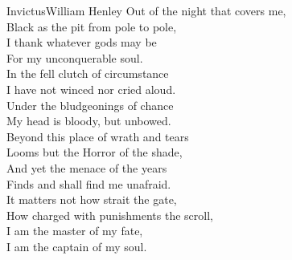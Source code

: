 \documentclass[../main.tex]{subfiles}
\begin{document}
	
	\begin{poem*}{Invictus}{William Henley}
		Out of the night that covers me,\\
		\hspace{2em}Black as the pit from pole to pole,\\
		I thank whatever gods may be\\
		\hspace{2em}For my unconquerable soul.\\[12pt]

		In the fell clutch of circumstance\\
		\hspace{2em}I have not winced nor cried aloud.\\
		Under the bludgeonings of chance\\
		\hspace{2em}My head is bloody, but unbowed.\\[12pt]

		Beyond this place of wrath and tears\\
		\hspace{2em}Looms but the Horror of the shade,\\
		And yet the menace of the years\\
		\hspace{2em}Finds and shall find me unafraid.\\[12pt]

		It matters not how strait the gate,\\
		\hspace{2em}How charged with punishments the scroll,\\
		I am the master of my fate,\\
		\hspace{2em}I am the captain of my soul.\\
	\end{poem*}
\end{document}
